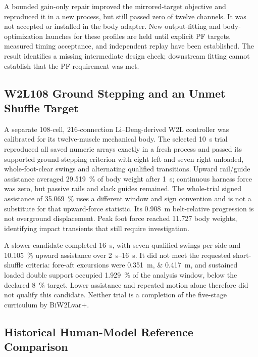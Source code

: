 A bounded gain-only repair improved the mirrored-target objective and reproduced it in a new process, but still passed zero of twelve channels. It was not accepted or installed in the body adapter. New output-fitting and body-optimization launches for these profiles are held until explicit PF targets, measured timing acceptance, and independent replay have been established. The result identifies a missing intermediate design check; downstream fitting cannot establish that the PF requirement was met.

\subsection{W2L108 Ground Stepping and an Unmet Shuffle Target}\label{sec:app_w2l108_ground}

A separate 108-cell, 216-connection Li--Deng-derived W2L controller was calibrated for its twelve-muscle mechanical body. The selected \qty{10}{\second} trial reproduced all saved numeric arrays exactly in a fresh process and passed its supported ground-stepping criterion with eight left and seven right unloaded, whole-foot-clear swings and alternating qualified transitions. Upward rail/guide assistance averaged \qty{29.519}{\percent} of body weight after \qty{1}{\second}; continuous harness force was zero, but passive rails and slack guides remained. The whole-trial signed assistance of \qty{35.069}{\percent} uses a different window and sign convention and is not a substitute for that upward-force statistic. Its \qty{0.908}{\meter} belt-relative progression is not overground displacement. Peak foot force reached 11.727 body weights, identifying impact transients that still require investigation.

A slower candidate completed \qty{16}{\second}, with seven qualified swings per side and \qty{10.105}{\percent} upward assistance over \qtyrange{2}{16}{\second}. It did not meet the requested short-shuffle criteria: fore-aft excursions were \qtylist{0.351;0.417}{\meter}, and sustained loaded double support occupied \qty{1.929}{\percent} of the analysis window, below the declared \qty{8}{\percent} target. Lower assistance and repeated motion alone therefore did not qualify this candidate. Neither trial is a completion of the five-stage curriculum by BiW2Lvar+.


\subsection{Historical Human-Model Reference Comparison}\label{sec:app_ik_overlay}\label{sec:gait_library_results}\label{sec:walker_variant_results}

